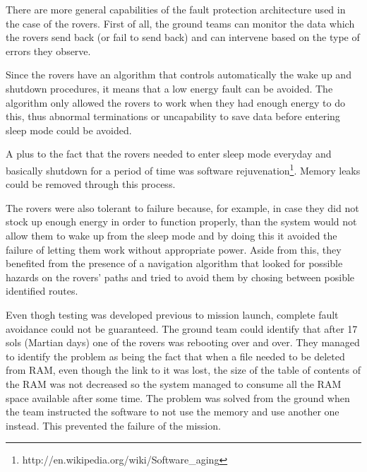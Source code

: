 There are more general capabilities of the fault protection architecture used in
the case of the rovers. First of all, the ground teams can monitor the data
which the rovers send back (or fail to send back) and can intervene based on the
type of errors they observe.

Since the rovers have an algorithm that controls automatically the wake up and
shutdown procedures, it means that a low energy fault can be avoided. The
algorithm only allowed the rovers to work when they had enough energy to do
this, thus abnormal terminations or uncapability to save data before entering
sleep mode could be avoided. 

A plus to the fact that the rovers needed to enter sleep mode everyday and
basically shutdown for a period of time was software
rejuvenation\footnote{http://en.wikipedia.org/wiki/Software\_aging}. Memory
leaks could be removed through this process.

The rovers were also tolerant to failure because, for example, in case they did
not stock up enough energy in order to function properly, than the system would
not allow them to wake up from the sleep mode and by doing this it avoided the
failure of letting them work without appropriate power. Aside from this, they
benefited from the presence of a navigation algorithm that looked for possible
hazards on the rovers' paths and tried to avoid them by chosing between posible
identified routes.

Even thogh testing was developed previous to mission launch, complete fault
avoidance could not be guaranteed. The ground team could identify that after 17
sols (Martian days) one of the rovers was rebooting over and over. They managed
to identify the problem as being the fact that when a file needed to be deleted
from RAM, even though the link to it was lost, the size of the table of contents
of the RAM was not decreased so the system managed to consume all the RAM space
available after some time. The problem was solved from the ground when the team
instructed the software to not use the memory and use another one instead. This
prevented the failure of the mission.
